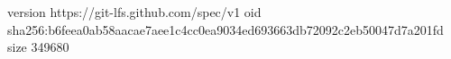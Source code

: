 version https://git-lfs.github.com/spec/v1
oid sha256:b6feea0ab58aacae7aee1c4cc0ea9034ed693663db72092c2eb50047d7a201fd
size 349680
